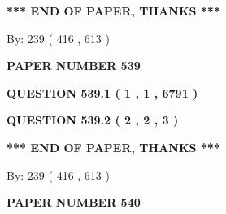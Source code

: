 \documentclass[12pt]{article}
\begin{document}
   
   
   
   
\vspace{1.0in} 
{\textbf{\large{ *** END OF PAPER, THANKS *** }}} 
   
   
\hspace{1.0in} By: 
 239 ( 416 ,  613 )
   
   
   
   
\newpage 
\setcounter{page}{ 
   539001 } 
   
   
   
   
 {\textbf{ \Large{ PAPER NUMBER  539  }}}
   
   
\vspace{0.2in}
   
   
   
   
   
   
 \vspace{0.2in}
 
 
 
 
   
   
  
\vspace{0.2in}
  
{\textbf{\Large{QUESTION
539.1 
 ( 1 , 1 , 6791 )
}}}
  
  
  
\vspace{0.2in}
  
{\textbf{\Large{QUESTION
539.2 
 ( 2 , 2 , 3 )
}}}
  
  
   
   
 \vspace{0.2in}
 
   
   
   
   
\vspace{1.0in} 
{\textbf{\large{ *** END OF PAPER, THANKS *** }}} 
   
   
\hspace{1.0in} By: 
 239 ( 416 ,  613 )
   
   
   
   
\newpage 
\setcounter{page}{ 
   540001 } 
   
   
   
   
 {\textbf{ \Large{ PAPER NUMBER  540  }}}
   
   
\vspace{0.2in}
   
\end{document}
